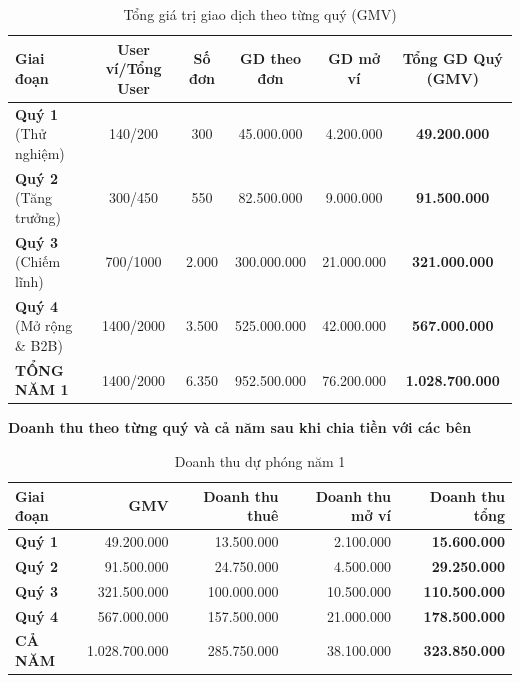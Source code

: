 \begin{table}[htbp]
    \centering
    \caption{Tổng giá trị giao dịch theo từng quý (GMV)}
    \begin{tabular}{@{}lccccc@{}}
        \toprule
        \textbf{Giai đoạn} & \textbf{User ví/Tổng User} & \textbf{Số đơn} & \textbf{GD theo đơn} & \textbf{GD mở ví} & \textbf{Tổng GD Quý (GMV)} \\
        \midrule
        \textbf{Quý 1} (Thử nghiệm) & 140/200 & 300 & 45.000.000 & 4.200.000 & \textbf{49.200.000} \\
        \textbf{Quý 2} (Tăng trưởng) & 300/450 & 550 & 82.500.000 & 9.000.000 & \textbf{91.500.000} \\
        \textbf{Quý 3} (Chiếm lĩnh) & 700/1000 & 2.000 & 300.000.000 & 21.000.000 & \textbf{321.000.000} \\
        \textbf{Quý 4} (Mở rộng \& B2B) & 1400/2000 & 3.500 & 525.000.000 & 42.000.000 & \textbf{567.000.000} \\
        \midrule
        \textbf{TỔNG NĂM 1} & 1400/2000 & 6.350 & 952.500.000 & 76.200.000 & \textbf{1.028.700.000} \\
        \bottomrule
    \end{tabular}
\end{table}

\textbf{Doanh thu theo từng quý và cả năm sau khi chia tiền với các bên}

\begin{table}[htbp]
    \centering
    \caption{Doanh thu dự phóng năm 1}
    \begin{tabular}{@{}lrrrr@{}}
        \toprule
        \textbf{Giai đoạn} & \textbf{GMV} & \textbf{Doanh thu thuê} & \textbf{Doanh thu mở ví} & \textbf{Doanh thu tổng} \\
        \midrule
        \textbf{Quý 1} & 49.200.000 & 13.500.000 & 2.100.000 & \textbf{15.600.000} \\
        \textbf{Quý 2} & 91.500.000 & 24.750.000 & 4.500.000 & \textbf{29.250.000} \\
        \textbf{Quý 3} & 321.500.000 & 100.000.000 & 10.500.000 & \textbf{110.500.000} \\
        \textbf{Quý 4} & 567.000.000 & 157.500.000 & 21.000.000 & \textbf{178.500.000} \\
        \midrule
        \textbf{CẢ NĂM} & 1.028.700.000 & 285.750.000 & 38.100.000 & \textbf{323.850.000} \\
        \bottomrule
    \end{tabular}
\end{table}

